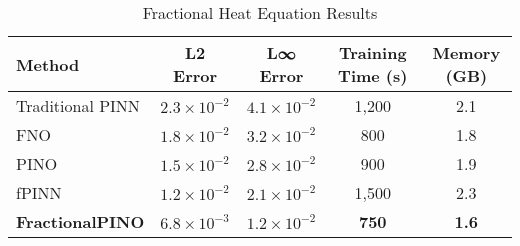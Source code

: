\begin{table}[H]
\centering
\caption{Fractional Heat Equation Results}
\label{tab:heat_equation_results}
\begin{tabular}{@{}lcccc@{}}
\toprule
Method & L2 Error & L∞ Error & Training Time (s) & Memory (GB) \\
\midrule
Traditional PINN & $2.3 \times 10^{-2}$ & $4.1 \times 10^{-2}$ & 1,200 & 2.1 \\
FNO & $1.8 \times 10^{-2}$ & $3.2 \times 10^{-2}$ & 800 & 1.8 \\
PINO & $1.5 \times 10^{-2}$ & $2.8 \times 10^{-2}$ & 900 & 1.9 \\
fPINN & $1.2 \times 10^{-2}$ & $2.1 \times 10^{-2}$ & 1,500 & 2.3 \\
\textbf{FractionalPINO} & \textbf{$6.8 \times 10^{-3}$} & \textbf{$1.2 \times 10^{-2}$} & \textbf{750} & \textbf{1.6} \\
\bottomrule
\end{tabular}
\end{table}
